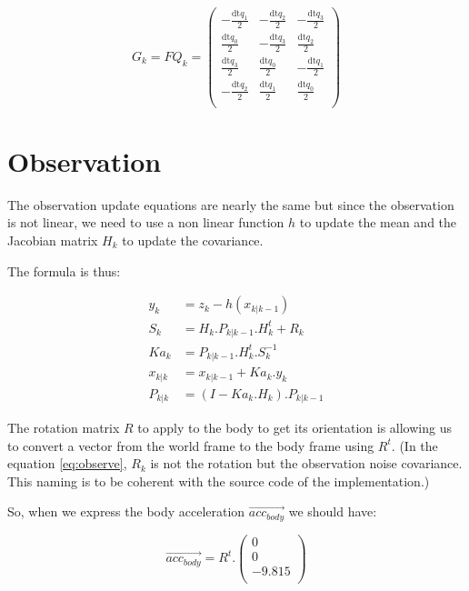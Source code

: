 \documentclass[titlepage,a4,12pt]{article}
\numberwithin{equation}{subsection}
\newcommand{\before}[1]{#1_{k|k-1}}
\newcommand{\after}[1]{#1_{k|k}}
\begin{document}
\begin{equation}\label{eq:Gmatrix}
G_k = FQ_k =\left(
\begin{array}{ccc}
 -\frac{\text{dt} q_1}{2} & -\frac{\text{dt} q_2}{2} & -\frac{\text{dt} q_3}{2} \\
 \frac{\text{dt} q_0}{2} & -\frac{\text{dt} q_3}{2} & \frac{\text{dt} q_2}{2} \\
 \frac{\text{dt} q_3}{2} & \frac{\text{dt} q_0}{2} & -\frac{\text{dt} q_1}{2} \\
 -\frac{\text{dt} q_2}{2} & \frac{\text{dt} q_1}{2} & \frac{\text{dt} q_0}{2} \\
\end{array}
\right)
\end{equation}

\section{Observation}

The observation update equations are nearly the same but since the observation is not linear, we need to use a non linear function $h$ to update the mean and the Jacobian matrix $H_k$ to update the covariance.

The formula is thus:

\begin{align}\label{eq:observe}
y_k &= z_k - h(\before{x})\\
S_k &= H_k . \before{P} . H_k^t + R_k\\
Ka_k&= \before{P} . H_k^t . S^{-1}_k \\
\after{x} &= \before{x} + Ka_k . y_k \\ 
\after{P} &= (I - Ka_k . H_k) . \before{P}
\end{align}

The rotation matrix $R$ to apply to the body to get its orientation is allowing us to convert a vector from the world frame to the body frame using $R^t$.
(In the equation \ref{eq:observe}, $R_k$ is not the rotation but the observation noise covariance. This naming is to be coherent with the source code of the implementation.)


So, when we express the body acceleration $\overrightarrow{acc_{body}}$ we should have:

\begin{equation}\label{eq:accworld}
\overrightarrow{acc_{body}} = R^t . \left(
\begin{array}{c}
 0 \\
 0 \\
 -9.815 \\
\end{array}
\right)
\end{equation}
\end{document}
